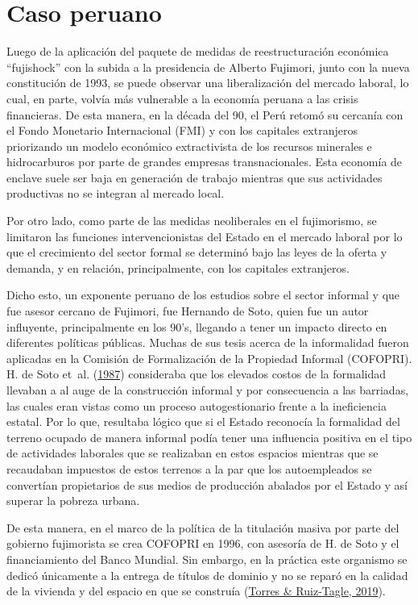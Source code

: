 \documentclass[
  letterpaper,
  12pt,
  oneside,
  spanish,
  doublespacing,
  headsepline,
  parskip]{MastersDoctoralThesis}
\begin{document}
\hypertarget{caso-peruano}{%
\section{Caso peruano}\label{caso-peruano}}

Luego de la aplicación del paquete de medidas de reestructuración
económica ``fujishock'' con la subida a la presidencia de Alberto
Fujimori, junto con la nueva constitución de 1993, se puede observar una
liberalización del mercado laboral, lo cual, en parte, volvía más
vulnerable a la economía peruana a las crisis financieras. De esta
manera, en la década del 90, el Perú retomó su cercanía con el Fondo
Monetario Internacional (FMI) y con los capitales extranjeros
priorizando un modelo económico extractivista de los recursos minerales
e hidrocarburos por parte de grandes empresas transnacionales. Esta
economía de enclave suele ser baja en generación de trabajo mientras que
sus actividades productivas no se integran al mercado local.

Por otro lado, como parte de las medidas neoliberales en el fujimorismo,
se limitaron las funciones intervencionistas del Estado en el mercado
laboral por lo que el crecimiento del sector formal se determinó bajo
las leyes de la oferta y demanda, y en relación, principalmente, con los
capitales extranjeros.

Dicho esto, un exponente peruano de los estudios sobre el sector
informal y que fue asesor cercano de Fujimori, fue Hernando de Soto,
quien fue un autor influyente, principalmente en los 90's, llegando a
tener un impacto directo en diferentes políticas públicas. Muchas de sus
tesis acerca de la informalidad fueron aplicadas en la Comisión de
Formalización de la Propiedad Informal (COFOPRI). H. de Soto et~al.
(\protect\hyperlink{ref-desoto1987}{1987}) consideraba que los elevados
costos de la formalidad llevaban a al auge de la construcción informal y
por consecuencia a las barriadas, las cuales eran vistas como un proceso
autogestionario frente a la ineficiencia estatal. Por lo que, resultaba
lógico que si el Estado reconocía la formalidad del terreno ocupado de
manera informal podía tener una influencia positiva en el tipo de
actividades laborales que se realizaban en estos espacios mientras que
se recaudaban impuestos de estos terrenos a la par que los autoempleados
se convertían propietarios de sus medios de producción abalados por el
Estado y así superar la pobreza urbana.

De esta manera, en el marco de la política de la titulación masiva por
parte del gobierno fujimorista se crea COFOPRI en 1996, con asesoría de
H. de Soto y el financiamiento del Banco Mundial. Sin embargo, en la
práctica este organismo se dedicó únicamente a la entrega de títulos de
dominio y no se reparó en la calidad de la vivienda y del espacio en que
se construía (\protect\hyperlink{ref-torres2019}{Torres \& Ruiz-Tagle,
2019}).
\end{document}
